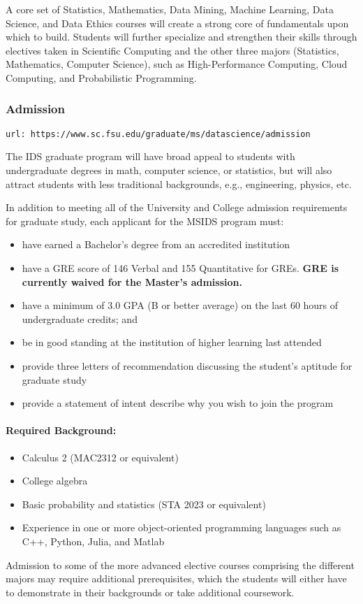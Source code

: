 \documentclass[12pt,a4paper]{article}
\begin{document}
A core set of Statistics, Mathematics, Data Mining, Machine Learning, Data Science, and Data Ethics courses will create a strong core of fundamentals upon which to build. Students will further specialize and strengthen their skills through electives taken in Scientific Computing and the other three majors (Statistics, Mathematics, Computer Science), such as High-Performance Computing, Cloud Computing, and Probabilistic Programming.

\subsubsection{Admission}
\texttt{url: https://www.sc.fsu.edu/graduate/ms/datascience/admission}

The IDS graduate program will have broad appeal to students with undergraduate degrees in math, computer science, or statistics, but will also attract students with less traditional backgrounds, e.g., engineering, physics, etc.

In addition to meeting all of the University and College admission requirements for graduate study, each applicant for the MSIDS program must:
\begin{itemize}
    \item have earned a Bachelor’s degree from an accredited institution
    \item have a GRE score of 146 Verbal and 155 Quantitative for GREs. \textbf{GRE is currently waived for the Master's admission.}
    \item have a minimum of 3.0 GPA (B or better average) on the last 60 hours of undergraduate credits; and
    \item be in good standing at the institution of higher learning last attended
    \item provide three letters of recommendation discussing the student’s aptitude for graduate study
    \item provide a statement of intent describe why you wish to join the program
\end{itemize}

\paragraph{Required Background:}
\begin{itemize}
    \item Calculus 2 (MAC2312 or equivalent)
    \item College algebra
    \item Basic probability and statistics (STA 2023 or equivalent)
    \item Experience in one or more object-oriented programming languages such as C++, Python, Julia, and Matlab
\end{itemize}
Admission to some of the more advanced elective courses comprising the different majors may require additional prerequisites, which the students will either have to demonstrate in their backgrounds or take additional coursework.
\end{document}
